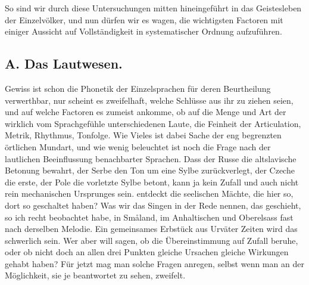 So sind wir durch diese Untersuchungen mitten hineingeführt in das Geistesleben der Einzelvölker, und nun dürfen wir es wagen, die wichtigsten  Factoren mit einiger Aussicht auf Vollständigkeit in systematischer Ordnung aufzuführen.

\subsection*{A. Das Lautwesen.}\label{IV.IV.18A}

Gewiss ist schon die Phonetik der Einzelsprachen für deren Beurtheilung verwerthbar, nur scheint es zweifelhaft, welche Schlüsse aus ihr zu ziehen seien, und auf welche Factoren es zumeist ankomme, ob auf die Menge und Art der wirklich vom Sprachgefühle unterschiedenen Laute, die Feinheit der Articulation, Metrik, Rhythmus, Tonfolge. Wie Vieles ist dabei Sache der eng begrenzten örtlichen Mundart, und wie wenig beleuchtet ist noch die Frage nach der lautlichen Beeinflussung benachbarter Sprachen. Dass der Russe die altslavische Betonung bewahrt, der Serbe den Ton um eine Sylbe zurückverlegt, der Czeche die erste, der Pole die vorletzte Sylbe betont,  kann ja kein Zufall und \label{sp.432} auch nicht rein mechanischen Ursprunges sein.   entdeckt die seelischen Mächte, die hier so, dort so geschaltet haben?  Was wir das Singen in der Rede nennen, das geschieht, so ich recht beobachtet habe, in Småland, im Anhaltischen und Oberelsass fast nach derselben Melodie. Ein gemeinsames Erbstück aus Urväter Zeiten wird das schwerlich sein. Wer aber will sagen, ob die Übereinstimmung auf Zufall beruhe, oder ob nicht doch an allen drei Punkten gleiche Ursachen gleiche Wirkungen gehabt haben? Für jetzt mag man solche Fragen anregen, selbst wenn man an der Möglichkeit, sie je beantwortet zu sehen, zweifelt.

